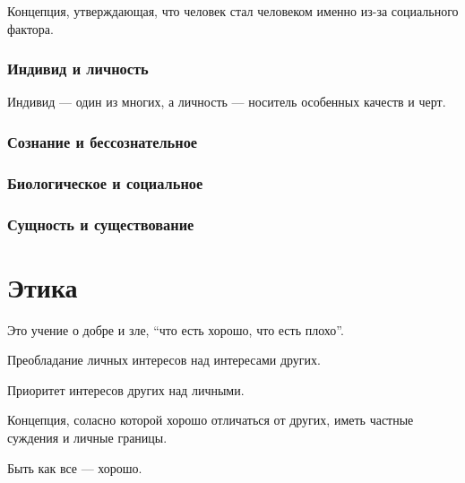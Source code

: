 \begin{definition}[Антропосоциогенез]
	Концепция, утверждающая, что человек стал человеком именно из-за социального
	фактора.
\end{definition}

\subsubsection{Индивид и личность}

Индивид --- один из многих, а личность --- носитель особенных качеств и черт.

\subsubsection{Сознание и бессознательное}

\subsubsection{Биологическое и социальное}

\subsubsection{Сущность и существование}

\section{Этика}

\begin{definition}[Этика]
	Это учение о добре и зле, ``что есть хорошо, что есть плохо''.
\end{definition}

\begin{example}[Эгоизм]
	Преобладание личных интересов над интересами других.
\end{example}

\begin{example}[Альтруизм]
	Приоритет интересов других над личными.
\end{example}

\begin{example}[Индивидуализм]
	Концепция, соласно которой хорошо отличаться от других, иметь частные суждения
	и личные границы.
\end{example}

\begin{example}[Коллективизм]
	Быть как все --- хорошо.
\end{example}
